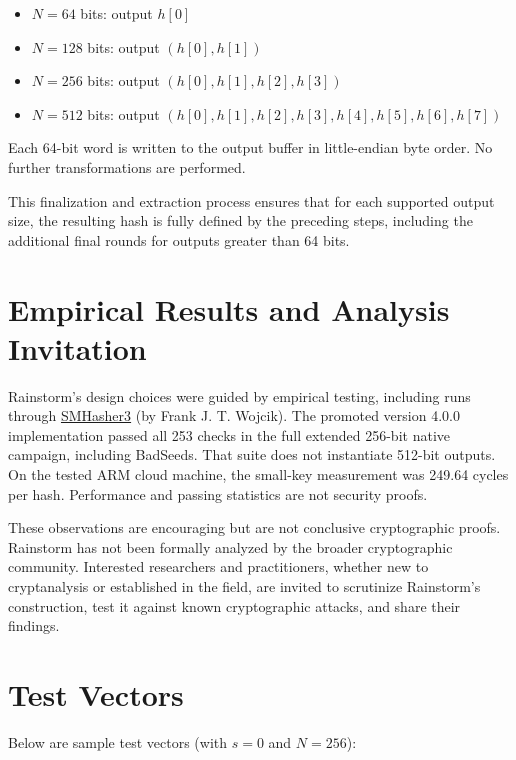 \documentclass[11pt,a4paper]{article}
\begin{document}
\begin{itemize}
  \item $N=64$ bits: output $h[0]$
  \item $N=128$ bits: output $(h[0], h[1])$
  \item $N=256$ bits: output $(h[0], h[1], h[2], h[3])$
  \item $N=512$ bits: output $(h[0], h[1], h[2], h[3], h[4], h[5], h[6], h[7])$
\end{itemize}

Each 64-bit word is written to the output buffer in little-endian byte order. No further transformations are performed.

\medskip

This finalization and extraction process ensures that for each supported output size, the resulting hash is fully defined by the preceding steps, including the additional final rounds for outputs greater than 64 bits.

\section*{Empirical Results and Analysis Invitation}
Rainstorm's design choices were guided by empirical testing, including runs through \href{https://gitlab.com/fwojcik/smhasher3}{SMHasher3} (by Frank J. T. Wojcik). The promoted version 4.0.0 implementation passed all 253 checks in the full extended 256-bit native campaign, including BadSeeds. That suite does not instantiate 512-bit outputs. On the tested ARM cloud machine, the small-key measurement was 249.64 cycles per hash. Performance and passing statistics are not security proofs.

These observations are encouraging but are not conclusive cryptographic proofs. Rainstorm has not been formally analyzed by the broader cryptographic community. Interested researchers and practitioners, whether new to cryptanalysis or established in the field, are invited to scrutinize Rainstorm’s construction, test it against known cryptographic attacks, and share their findings.

\section*{Test Vectors}
Below are sample test vectors (with $s=0$ and $N=256$):
\end{document}
